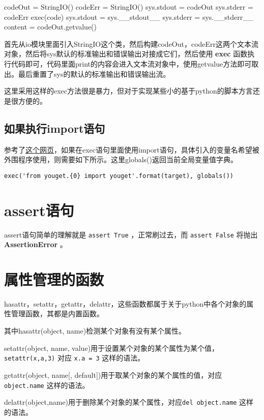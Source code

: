 \documentclass[12pt,oneside]{book}
\begin{document}
\begin{common-format}
\begin{tcbpython}[]
    codeOut = StringIO()
    codeErr = StringIO()
    sys.stdout = codeOut
    sys.stderr = codeErr
    exec(code)
    sys.stdout = sys.__stdout__
    sys.stderr = sys.__stderr__
    content = codeOut.getvalue()
\end{tcbpython}

首先从io模块里面引入StringIO这个类，然后构建codeOut，codeErr这两个文本流对象，然后将sys默认的标准输出和错误输出对接成它们，然后使用 \textbf{exec} 函数执行代码即可，代码里面print的内容会进入文本流对象中，使用getvalue方法即可取出。最后重置了sys的默认的标准输出和错误输出流。

这里采用这样的exec方法很是暴力，但对于实现某些小的基于python的脚本方言还是很方便的。

\subsection{如果执行import语句}
参考了\href{http://stackoverflow.com/questions/12505047/in-python-why-doesnt-an-import-in-an-exec-in-a-function-work}{这个网页}，如果在exec语句里面使用import语句，具体引入的变量名希望被外围程序使用，则需要如下所示。这里globals()返回当前全局变量值字典。
\begin{Verbatim}
exec('from youget.{0} import youget'.format(target), globals())
\end{Verbatim}




\section{assert语句}
assert语句简单的理解就是 \verb+assert True+ ，正常刷过去，而 \verb+assert False+ 将抛出\textbf{AssertionError} 。


\section{属性管理的函数}
hasattr，setattr，getattr，delattr，这些函数都属于关于python中各个对象的属性管理函数，其都是内置函数。

其中hasattr(object, name)检测某个对象有没有某个属性。

setattr(object, name, value)用于设置某个对象的某个属性为某个值，\verb+setattr(x,a,3)+ 对应 \verb+x.a = 3+ 这样的语法。

getattr(object, name[, default])用于取某个对象的某个属性的值，对应 \verb+object.name+ 这样的语法。

delattr(object,name)用于删除某个对象的某个属性，对应\verb+del object.name+ 这样的语法。






\end{common-format}
\end{document}
